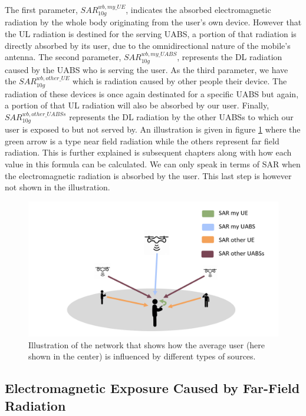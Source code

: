The first parameter, $SAR^{wb,my\_UE}_{10g}$, indicates the absorbed electromagnetic radiation by the whole body originating from the user's own device. However that the 
\gls{UL} radiation is destined for the serving \gls{UABS}, a portion of that radiation is directly absorbed by its user, due to the omnidirectional nature of the mobile's antenna.
The second parameter, $SAR^{wb,my\_UABS}_{10g}$, represents the \gls{DL} radiation caused by the \gls{UABS} who is serving the user.
As the third parameter, we have the $SAR^{wb,other\_UE}_{10g}$ which is radiation caused by other people their device. The radiation of these devices is once again 
destinated for a specific \gls{UABS} but again, a portion of that \gls{UL} radiation will also be absorbed by our user.
Finally, $SAR^{wb,other\_UABSs}_{10g}$ represents the \gls{DL} radiation by the other \gls{UABS}s to which our user is exposed to but not served by.
An illustration is given in figure \ref{fig:networkIllustration} where the green arrow is a type near field radiation while 
the others represent far field radiation. This is further 
explained is subsequent chapters along with how each value in this formula can be calculated. We can only speak in terms of \gls{SAR}
  when the electromagnetic radiation is absorbed by the user. This last step is however not shown in the illustration.

\begin{figure}[h!]
\centering
  \includegraphics[width=\textwidth/3*2]{../images/networkIllustrationSARSources.png}
  \caption{Illustration of the network that shows how the average user (here shown in the center) is influenced by different types of sources. }
  \label{fig:networkIllustration}
\end{figure}

\subsection{Electromagnetic Exposure Caused by Far-Field Radiation} %
\label{sub:Calculatingdownlinkexpsure}

